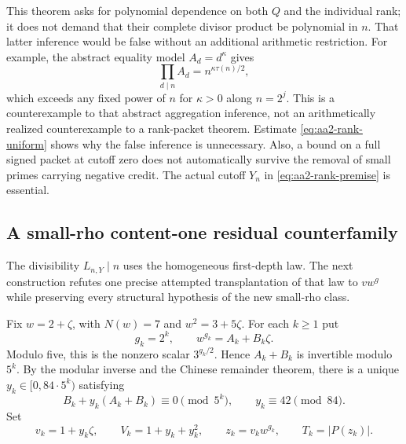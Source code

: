 This theorem asks for polynomial dependence on both $Q$ and the individual
rank; it does not demand that their complete divisor product be polynomial
in $n$. That latter inference would be false without an additional arithmetic
restriction. For example, the abstract equality model $A_d=d^\kappa$ gives
\[
 \prod_{d\mid n}A_d=n^{\kappa\tau(n)/2},
\]
which exceeds any fixed power of $n$ for $\kappa>0$ along $n=2^j$.
This is a counterexample to that abstract aggregation inference, not an
arithmetically realized counterexample to a rank-packet theorem. Estimate
\eqref{eq:aa2-rank-uniform} shows why the false inference is unnecessary.
Also, a bound on a full signed packet at cutoff zero does not automatically
survive the removal of small primes carrying negative credit. The actual
cutoff $Y_n$ in \eqref{eq:aa2-rank-premise} is essential.

\subsection{A small-rho content-one residual counterfamily}
The divisibility $L_{n,Y}\mid n$ uses the homogeneous first-depth law.
The next construction refutes one precise attempted transplantation of that
law to $vw^g$ while preserving every structural hypothesis of the new
small-rho class.

Fix $w=2+\zeta$, with $N(w)=7$ and $w^2=3+5\zeta$. For each $k\ge1$ put
\[
 g_k=2^k,\qquad w^{g_k}=A_k+B_k\zeta.
\]
Modulo five, this is the nonzero scalar $3^{g_k/2}$. Hence $A_k+B_k$ is
invertible modulo $5^k$. By the modular inverse and the Chinese remainder
theorem, there is a unique $y_k\in[0,84\cdot5^k)$ satisfying
\begin{equation}\label{eq:aa2-crt}
 B_k+y_k(A_k+B_k)\equiv0\pmod{5^k},
 \qquad y_k\equiv42\pmod{84}.
\end{equation}
Set
\[
 v_k=1+y_k\zeta,\qquad V_k=1+y_k+y_k^2,
 \qquad z_k=v_kw^{g_k},\qquad T_k=|P(z_k)|.
\]

